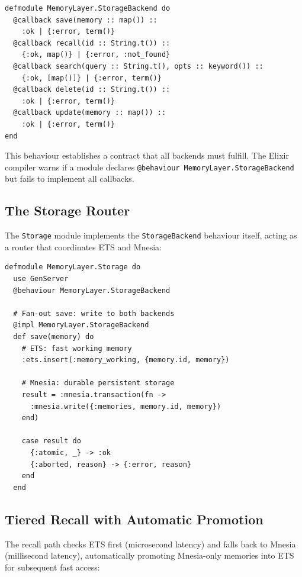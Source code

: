 \documentclass[12pt,a4paper]{article}
\theoremstyle{definition}
\begin{document}
\begin{lstlisting}[caption={StorageBackend behaviour: the five required callbacks.}, label={lst:storage-behaviour}]
defmodule MemoryLayer.StorageBackend do
  @callback save(memory :: map()) ::
    :ok | {:error, term()}
  @callback recall(id :: String.t()) ::
    {:ok, map()} | {:error, :not_found}
  @callback search(query :: String.t(), opts :: keyword()) ::
    {:ok, [map()]} | {:error, term()}
  @callback delete(id :: String.t()) ::
    :ok | {:error, term()}
  @callback update(memory :: map()) ::
    :ok | {:error, term()}
end
\end{lstlisting}

This behaviour establishes a contract that all backends must fulfill.
The Elixir compiler warns if a module declares \texttt{@behaviour MemoryLayer.StorageBackend} but fails to implement all callbacks.

\subsection{The Storage Router}\label{subsec:storage-router}

The \texttt{Storage} module implements the \texttt{StorageBackend} behaviour itself, acting as a router that coordinates ETS and Mnesia:

\begin{lstlisting}[caption={Storage router: fan-out save to ETS and Mnesia.}, label={lst:storage-save}]
defmodule MemoryLayer.Storage do
  use GenServer
  @behaviour MemoryLayer.StorageBackend

  # Fan-out save: write to both backends
  @impl MemoryLayer.StorageBackend
  def save(memory) do
    # ETS: fast working memory
    :ets.insert(:memory_working, {memory.id, memory})

    # Mnesia: durable persistent storage
    result = :mnesia.transaction(fn ->
      :mnesia.write({:memories, memory.id, memory})
    end)

    case result do
      {:atomic, _} -> :ok
      {:aborted, reason} -> {:error, reason}
    end
  end
\end{lstlisting}

\subsection{Tiered Recall with Automatic Promotion}\label{subsec:tiered-recall}

The recall path checks ETS first (microsecond latency) and falls back to Mnesia (millisecond latency), automatically promoting Mnesia-only memories into ETS for subsequent fast access:
\end{document}
